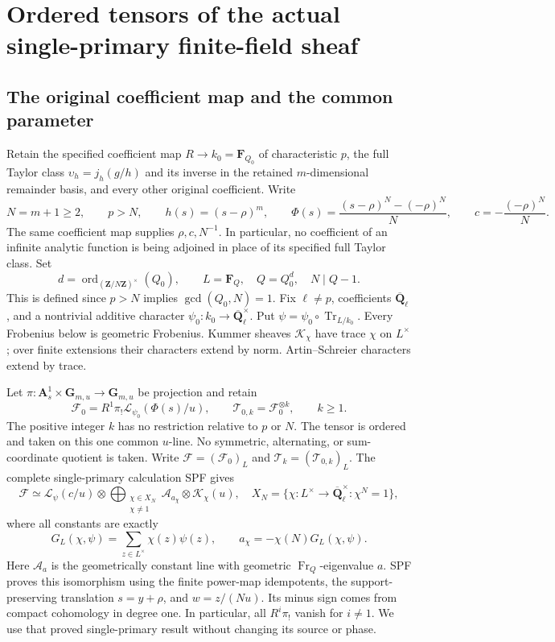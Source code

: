 \section{Ordered tensors of the actual single-primary finite-field sheaf}
\label{sec:TPF}

\subsection{The original coefficient map and the common parameter}

Retain the specified coefficient map \(R\to k_0=\mathbf F_{Q_0}\)
of characteristic \(p\), the full Taylor class
\(\upsilon_h=j_h(g/h)\) and its inverse in the retained
\(m\)-dimensional remainder basis, and every other original
coefficient. Write
\[
 N=m+1\ge2,\qquad p>N,\qquad
 h(s)=(s-\rho)^m,\qquad
 \Phi(s)=\frac{(s-\rho)^N-(-\rho)^N}{N},\qquad
 c=-\frac{(-\rho)^N}{N}.
 \tag{TPF.1}\label{eq:TPF1}
\]
The same coefficient map supplies \(\rho,c,N^{-1}\). In
particular, no coefficient of an infinite analytic function
is being adjoined in place of its specified full Taylor class.
Set
\[
 d=\operatorname{ord}_{(\mathbf Z/N\mathbf Z)^\times}(Q_0),
 \qquad L=\mathbf F_Q,\quad Q=Q_0^d,\quad N\mid Q-1.
 \tag{TPF.2}\label{eq:TPF2}
\]
This is defined since \(p>N\) implies \(\gcd(Q_0,N)=1\).
Fix \(\ell\ne p\), coefficients \(\overline{\mathbf Q}_\ell\),
and a nontrivial additive character \(\psi_0:k_0\to
\overline{\mathbf Q}_\ell^\times\). Put
\(\psi=\psi_0\circ\operatorname{Tr}_{L/k_0}\).
Every Frobenius below is geometric Frobenius. Kummer sheaves
\(\mathcal K_\chi\) have trace \(\chi\) on \(L^\times\);
over finite extensions their characters extend by norm.
Artin--Schreier characters extend by trace.

Let \(\pi:\mathbf A^1_s\times\mathbf G_{m,u}\to\mathbf
G_{m,u}\) be projection and retain
\[
 \mathcal F_0=R^1\pi_!\mathcal L_{\psi_0}(\Phi(s)/u),\qquad
 \mathcal T_{0,k}=\mathcal F_0^{\otimes k},\qquad k\ge1.
 \tag{TPF.3}\label{eq:TPF3}
\]
The positive integer \(k\) has no restriction relative to
\(p\) or \(N\). The tensor is ordered and taken on this
one common \(u\)-line. No symmetric, alternating, or
sum-coordinate quotient is taken. Write
\(\mathcal F=(\mathcal F_0)_L\) and
\(\mathcal T_k=(\mathcal T_{0,k})_L\).
The complete single-primary calculation SPF gives
\[
 \mathcal F\simeq
 \mathcal L_\psi(c/u)\otimes
 \bigoplus_{\substack{\chi\in X_N\\\chi\ne1}}
        \mathcal A_{a_\chi}\otimes\mathcal K_\chi(u),
 \quad
 X_N=\{\chi:L^\times\to\overline{\mathbf Q}_\ell^\times:
                      \chi^N=1\},
 \tag{TPF.4}\label{eq:TPF4}
\]
where all constants are exactly
\[
 G_L(\chi,\psi)=\sum_{z\in L^\times}\chi(z)\psi(z),
 \qquad
 a_\chi=-\chi(N)G_L(\chi,\psi).
 \tag{TPF.5}\label{eq:TPF5}
\]
Here \(\mathcal A_a\) is the geometrically constant line
with geometric \(\operatorname{Fr}_Q\)-eigenvalue \(a\).
SPF proves this isomorphism using the finite power-map
idempotents, the support-preserving translation
\(s=y+\rho\), and \(w=z/(Nu)\). Its minus sign comes from
compact cohomology in degree one. In particular, all
\(R^i\pi_!\) vanish for \(i\ne1\). We use that proved
single-primary result without changing its source or phase.

